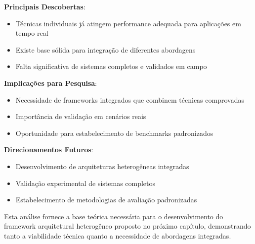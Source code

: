 \textbf{Principais Descobertas}:
\begin{itemize}
    \item Técnicas individuais já atingem performance adequada para aplicações em tempo real
    \item Existe base sólida para integração de diferentes abordagens
    \item Falta significativa de sistemas completos e validados em campo
\end{itemize}

\textbf{Implicações para Pesquisa}:
\begin{itemize}
    \item Necessidade de frameworks integrados que combinem técnicas comprovadas
    \item Importância de validação em cenários reais
    \item Oportunidade para estabelecimento de benchmarks padronizados
\end{itemize}

\textbf{Direcionamentos Futuros}:
\begin{itemize}
    \item Desenvolvimento de arquiteturas heterogêneas integradas
    \item Validação experimental de sistemas completos
    \item Estabelecimento de metodologias de avaliação padronizadas
\end{itemize}

Esta análise fornece a base teórica necessária para o desenvolvimento do framework arquitetural heterogêneo proposto no próximo capítulo, demonstrando tanto a viabilidade técnica quanto a necessidade de abordagens integradas.
